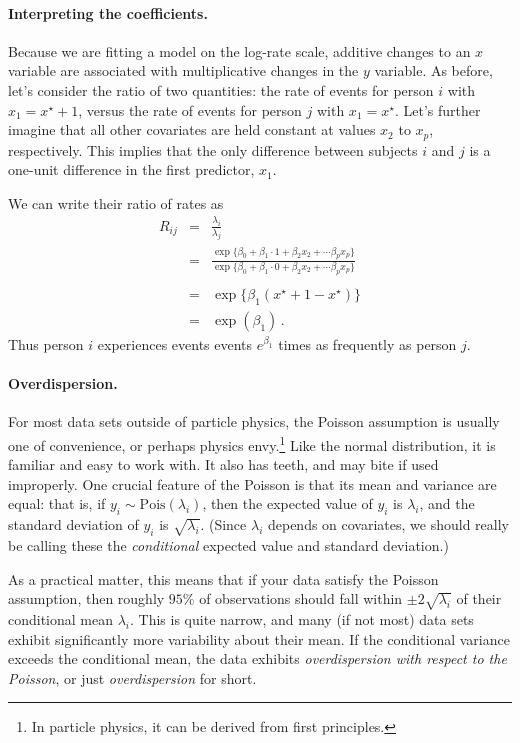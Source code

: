 \documentclass[11pt]{article}
\newcommand{\1}[1]{\mathbf{1}_{\{ {#1} \}}}
\begin{document}
\paragraph{Interpreting the coefficients.}
Because we are fitting a model on the log-rate scale, additive changes to an $x$ variable are associated with multiplicative changes in the $y$ variable.  As before, let's consider the ratio of two quantities: the rate of events for person $i$ with $x_1 = x^{\star} + 1$, versus the rate of events for person $j$ with $x_1 = x^{\star}$.  Let's further imagine that all other covariates are held constant at values $x_2$ to $x_p$, respectively.  This implies that the only difference between subjects $i$ and $j$ is a one-unit difference in the first predictor, $x_1$.

We can write their ratio of rates as
\begin{eqnarray*}
R_{ij} &=& \frac{\lambda_i}{\lambda_j} \\
&=& \frac{ \exp\{ \beta_0 + \beta_1 \cdot 1 + \beta_2 x_2 + \cdots \beta_p x_p \} } { \exp\{ \beta_0 + \beta_1 \cdot 0 + \beta_2 x_2 + \cdots \beta_p x_p \} } \\
\\
&=& \exp\{ \beta_1 (x^{\star} + 1 - x^\star) \} \\
&=& \exp (\beta_1) \, .
\end{eqnarray*}
Thus person $i$ experiences events events $e^{\beta_1}$ times as frequently as person $j$.

\paragraph{Overdispersion.}  For most data sets outside of particle physics, the Poisson assumption is usually one of convenience, or perhaps physics envy.\footnote{In particle physics, it can be derived from first principles.}  Like the normal distribution, it is familiar and easy to work with.  It also has teeth, and may bite if used improperly.  One crucial feature of the Poisson is that its mean and variance are equal: that is, if $y_i \sim \mbox{Pois}(\lambda_i)$, then the expected value of $y_i$ is $\lambda_i$, and the standard deviation of $y_i$ is $\sqrt{\lambda_i}$.  (Since $\lambda_i$ depends on covariates, we should really be calling these the \textit{conditional} expected value and standard deviation.)

As a practical matter, this means that if your data satisfy the Poisson assumption, then roughly $95\%$ of observations should fall within $\pm 2 \sqrt{\lambda_i}$ of their conditional mean $\lambda_i$.  This is quite narrow, and many (if not most) data sets exhibit significantly more variability about their mean.  If the conditional variance exceeds the conditional mean, the data exhibits \textit{overdispersion with respect to the Poisson}, or just \textit{overdispersion} for short.
\end{document}
